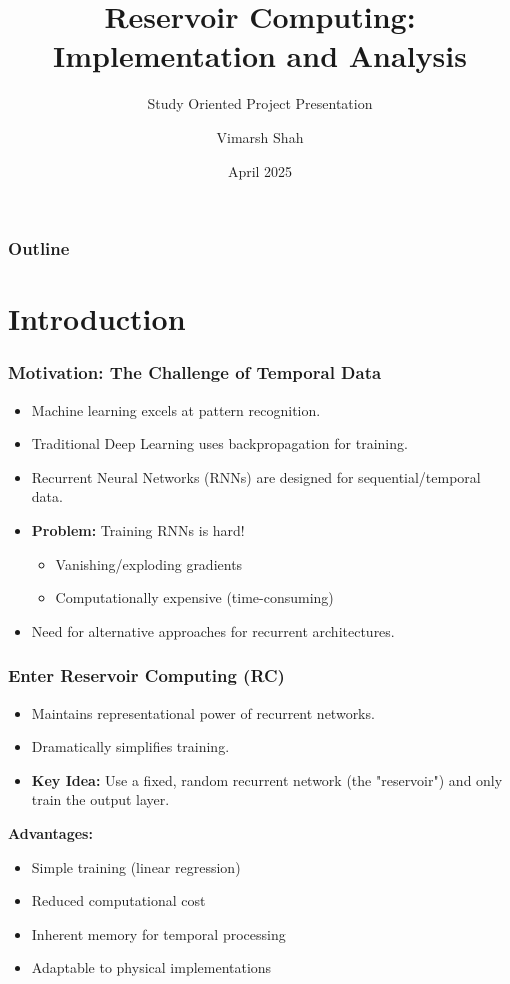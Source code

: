 \documentclass{beamer}
\title[Reservoir Computing]{Reservoir Computing: Implementation and Analysis}
\subtitle{Study Oriented Project Presentation}
\author{Vimarsh Shah}
\institute[BITS Pilani, Goa]{Department of Physics \\ BITS Pilani, K K Birla Goa Campus}
\date{April 2025}
\begin{document}
\begin{frame}
  \titlepage
\end{frame}

\begin{frame}
  \frametitle{Outline}
  \tableofcontents
\end{frame}

\section{Introduction}

\begin{frame}
  \frametitle{Motivation: The Challenge of Temporal Data}
  \begin{itemize}
    \item Machine learning excels at pattern recognition.
    \item Traditional Deep Learning uses backpropagation for training.
    \item Recurrent Neural Networks (RNNs) are designed for sequential/temporal data.
    \item \textbf{Problem:} Training RNNs is hard!
      \begin{itemize}
          \item Vanishing/exploding gradients
          \item Computationally expensive (time-consuming)
      \end{itemize}
    \item Need for alternative approaches for recurrent architectures.
  \end{itemize}
\end{frame}

\begin{frame}
  \frametitle{Enter Reservoir Computing (RC)}
  \begin{itemize}
    \item Maintains representational power of recurrent networks.
    \item Dramatically simplifies training.
    \item \textbf{Key Idea:} Use a fixed, random recurrent network (the "reservoir") and only train the output layer.
  \end{itemize}
  \pause
  \textbf{Advantages:}
  \begin{itemize}
    \item Simple training (linear regression)
    \item Reduced computational cost
    \item Inherent memory for temporal processing
    \item Adaptable to physical implementations
  \end{itemize}
\end{frame}
\end{document}
